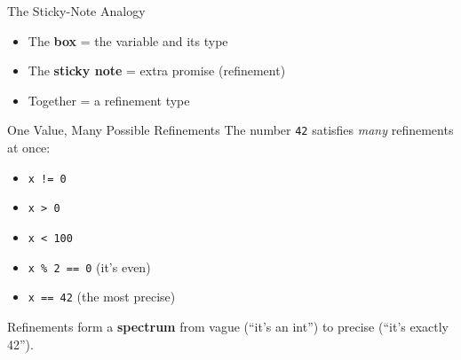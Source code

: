 \documentclass[aspectratio=169,10pt]{beamer}
\begin{document}
\begin{frame}{The Sticky-Note Analogy}
\begin{center}
\end{center}
\vspace{0.5em}
\begin{itemize}
  \item The \textbf{box} = the variable and its type
  \item The \textbf{sticky note} = extra promise (refinement)
  \item Together = a refinement type
\end{itemize}
\end{frame}

\begin{frame}{One Value, Many Possible Refinements}
The number \texttt{42} satisfies \emph{many} refinements at once:
\vspace{0.3em}
\begin{itemize}
  \item \texttt{x != 0} \quad\textcolor{safe}{\checkmark}
  \item \texttt{x > 0} \quad\textcolor{safe}{\checkmark}
  \item \texttt{x < 100} \quad\textcolor{safe}{\checkmark}
  \item \texttt{x \% 2 == 0} \quad\textcolor{safe}{\checkmark} (it's even)
  \item \texttt{x == 42} \quad\textcolor{safe}{\checkmark} (the most precise)
\end{itemize}
\vspace{0.3em}
Refinements form a \textbf{spectrum} from vague (``it's an int'') to precise (``it's exactly 42'').
\end{frame}
\end{document}
